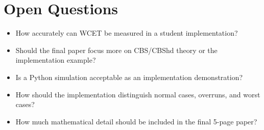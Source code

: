 \documentclass[a4paper,11pt]{article}
\begin{document}
\section*{Open Questions}

\begin{itemize}
    \item How accurately can WCET be measured in a student implementation?
    \item Should the final paper focus more on CBS/CBShd theory or the implementation example?
    \item Is a Python simulation acceptable as an implementation demonstration?
    \item How should the implementation distinguish normal cases, overruns, and worst cases?
    \item How much mathematical detail should be included in the final 5-page paper?
\end{itemize}
\end{document}
